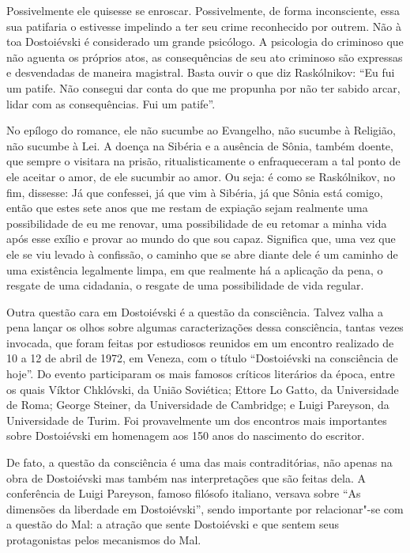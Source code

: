 Possivelmente ele quisesse se enroscar. Possivelmente, de forma
inconsciente, essa sua patifaria o estivesse impelindo a ter seu crime
reconhecido por outrem. Não à toa Dostoiévski é considerado um grande
psicólogo. A psicologia do criminoso que não aguenta os próprios atos,
as consequências de seu ato criminoso são expressas e desvendadas de
maneira magistral. Basta ouvir o que diz Raskólnikov: ``Eu fui um
patife. Não consegui dar conta do que me propunha por não ter sabido
arcar, lidar com as consequências. Fui um patife''.

No epílogo do romance, ele não sucumbe ao Evangelho, não sucumbe à
Religião, não sucumbe à Lei. A doença na Sibéria e a ausência de Sônia,
também doente, que sempre o visitara na prisão, ritualisticamente o
enfraqueceram a tal ponto de ele aceitar o amor, de ele sucumbir ao
amor. Ou seja: é como se Raskólnikov, no fim, dissesse: Já que
confessei, já que vim à Sibéria, já que Sônia está comigo, então que
estes sete anos que me restam de expiação sejam realmente uma
possibilidade de eu me renovar, uma possibilidade de eu retomar a minha
vida após esse exílio e provar ao mundo do que sou capaz. Significa que,
uma vez que ele se viu levado à confissão, o caminho que se abre diante
dele é um caminho de uma existência legalmente limpa, em que realmente
há a aplicação da pena, o resgate de uma cidadania, o resgate de uma
possibilidade de vida regular.

Outra questão cara em Dostoiévski é a questão da consciência. Talvez
valha a pena lançar os olhos sobre algumas caracterizações dessa
consciência, tantas vezes invocada, que foram feitas por estudiosos
reunidos em um encontro realizado de 10 a 12 de abril de 1972, em
Veneza, com o título ``Dostoiévski na consciência de hoje''. Do evento
participaram os mais famosos críticos literários da época, entre os
quais Víktor Chklóvski, da União Soviética; Ettore Lo Gatto, da
Universidade de Roma; George Steiner, da Universidade de Cambridge; e
Luigi Pareyson, da Universidade de Turim. Foi provavelmente um dos
encontros mais importantes sobre Dostoiévski em homenagem aos 150 anos
do nascimento do escritor.

De fato, a questão da consciência é uma das mais contraditórias, não
apenas na obra de Dostoiévski mas também nas interpretações que são
feitas dela. A conferência de Luigi Pareyson, famoso filósofo italiano,
versava sobre ``As dimensões da liberdade em Dostoiévski'', sendo
importante por relacionar"-se com a questão do Mal: a atração que sente
Dostoiévski e que sentem seus protagonistas pelos mecanismos do Mal.

